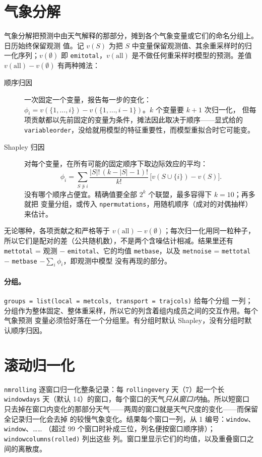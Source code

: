 \documentclass[11pt]{ctexrep}
\newcommand{\codeunderscore}{\textunderscore\allowbreak}
\newcommand{\code}[1]{\texttt{\let\_\codeunderscore #1}}
\begin{document}
\section{气象分解}\label{sec:metdecomp}
气象分解把预测中由天气解释的那部分，摊到各个气象变量或它们的命名分组上。日历始终保留观测
值。记 $v(S)$ 为把 $S$ 中变量保留观测值、其余重采样时的归一化序列；$v(\emptyset)$ 即
\code{emi\_total}，$v(\text{all})$ 是不做任何重采样时模型的预测。差值
$v(\text{all}) - v(\emptyset)$ 有两种摊法：
\begin{description}
  \item[顺序归因] 一次固定一个变量，报告每一步的变化：
        $\phi_i = v(\{1,\dots,i\}) - v(\{1,\dots,i-1\})$。$k$ 个变量要 $k+1$ 次归一化，
        但每项贡献都以先前固定的变量为条件，摊法因此取决于顺序——显式给的
        \code{variable\_order}，没给就用模型的特征重要性，而模型重拟合时它可能变。
  \item[Shapley 归因] 对每个变量，在所有可能的固定顺序下取边际效应的平均：
        \begin{equation}
          \phi_i = \sum_{S \not\ni i} \frac{|S|!\,(k-|S|-1)!}{k!}\,
                   \bigl[v(S\cup\{i\}) - v(S)\bigr].
        \end{equation}
        没有哪个顺序占便宜。精确值要全部 $2^k$ 个联盟，最多容得下 $k=10$；再多就把
        变量分组，或传入 \code{n\_permutations}，用随机顺序（成对的对偶抽样）来估计。
\end{description}
无论哪种，各项贡献之和严格等于 $v(\text{all}) - v(\emptyset)$；每次归一化用同一粒种子，
所以它们是配对的差（公共随机数），不是两个含噪估计相减。结果里还有
\code{met\_total} = 观测 $-$ \code{emi\_total}、它的均值 \code{met\_base}，以及
\code{met\_noise} = \code{met\_total} $-$ \code{met\_base} $-\sum_i\phi_i$，即观测中模型
没有再现的部分。

\paragraph{分组。}\code{groups = list(local = met\_cols, transport = traj\_cols)} 给每个分组
一列；分组作为整体固定、整体重采样，所以它的列含着组内成员之间的交互作用。每个气象预测
变量必须恰好落在一个分组里。有分组时默认 Shapley，没有分组时默认顺序归因。

\section{滚动归一化}\label{sec:rolling}
\code{nm\_rolling} 逐窗口归一化整条记录：每 \code{rolling\_every} 天（7）起一个长
\code{window\_days} 天（默认 14）的窗口，每个窗口的天气\emph{只从窗口内}抽。所以短窗口
只去掉在窗口内变化的那部分天气——两周的窗口就是天气尺度的变化——而保留全记录归一化会去掉
的较慢气象变化。结果每个窗口一列，从 1 编号：\code{window\_01}、\code{window\_02}、……
（超过 99 个窗口时补成三位，列名便按窗口顺序排）；\code{window\_columns(rolled)} 列出这些
列。窗口里显示它们的均值，以及重叠窗口之间的离散度。
\end{document}
